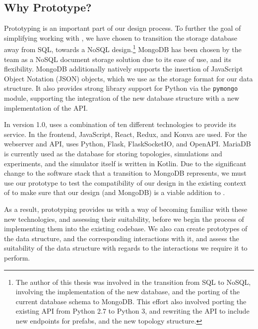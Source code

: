 \documentclass[11pt]{article}
\begin{document}
	\subsection{Why Prototype?}
		Prototyping is an important part of our design process.
		To further the goal of simplifying working with \opendc{}, we have chosen to transition the storage database away from SQL, towards a NoSQL design.\footnote{The author of this thesis was involved in the transition from SQL to NoSQL, involving the implementation of the new database, and the porting of the current database schema to MongoDB. 
		This effort also involved porting the existing \opendc{} API from Python 2.7 to Python 3, and rewriting the API to include new endpoints for prefabs, and the new topology structure.}
		MongoDB has been chosen by the \opendc{} team as a NoSQL document storage solution due to its ease of use, and its flexibility.
		MongoDB additionally natively supports the insertion of JavaScript Object Notation (JSON) objects, which we use as the storage format for our data structure.
		It also provides strong library support for Python via the \verb|pymongo| module, supporting the integration of the new database structure with a new implementation of the \opendc{} API.

		In version 1.0, \opendc{} uses a combination of ten different technologies to provide its service.
		In the frontend, JavaScript, React, Redux, and Konva are used. For the webserver and API, \opendc{} uses Python, Flask, FlaskSocketIO, and OpenAPI.
		MariaDB is currently used as the database for storing topologies, simulations and experiments, and the simulator itself is written in Kotlin.
		Due to the significant change to the software stack that a transition to MongoDB represents, we must use our prototype to test the compatibility of our design in the existing context of \opendc{} to make sure that our design (and MongoDB) is a viable addition to \opendc{}.

		As a result, prototyping provides us with a way of becoming familiar with these new technologies, and assessing their suitability, before we begin the process of implementing them into the existing \opendc{} codebase.
		We also can create prototypes of the data structure, and the corresponding interactions with it, and assess the suitability of the data structure with regards to the interactions we require it to perform.
\end{document}
